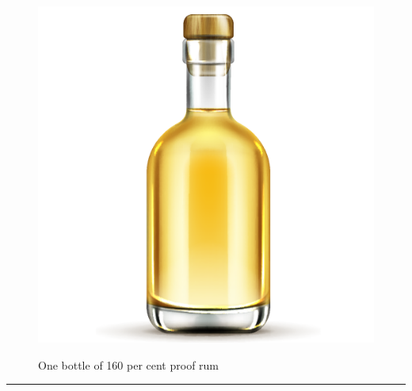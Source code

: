 \documentclass{article}
\begin{document}
    \begin{figure}[H]
        \centering
        \begin{minipage}{0.25\textwidth}
            \centering
            \includegraphics[width=\textwidth]{../SurvivalItemImages/strongrum}
        \end{minipage}\hfill
        \begin{minipage}{0.7\textwidth}
            \centering
            \Large One bottle of 160 per cent proof rum
        \end{minipage}
    \end{figure}
    \vspace{-0.8em}
    \noindent\rule{\textwidth}{0.4pt}
            
\end{document}
